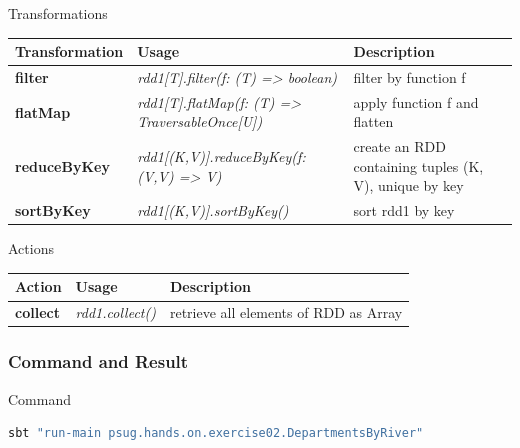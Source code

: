 \documentclass[slidetop,9pt,utf8]{beamer}
\begin{document}
\begin{CJK}{UTF8}{gbsn}
\begin{frame}
  \begin{block}{Transformations}
    \begin{center}
      \begin{tabular}{|m{2.0cm}|m{4.0cm}|m{4.9cm}|}
        \hline 
        \rowcolor{gray} \textbf{Transformation} & \textbf{Usage} & \textbf{Description} \\ \hline
        \textbf{filter} & \textit{rdd1[T]\newline.filter(f: (T) =\textgreater\xspace boolean)} & filter by function f \\ \hline
        \textbf{flatMap} & \textit{rdd1[T].flatMap(f: (T) =\textgreater\xspace TraversableOnce[U])} & apply function f and flatten \\ \hline
        \textbf{reduceByKey} & \textit{rdd1[(K,V)]\newline.reduceByKey(f:(V,V) =\textgreater\xspace V)} & create an RDD containing tuples (K, V), unique by key \\ \hline
        \textbf{sortByKey} & \textit{rdd1[(K,V)].sortByKey()} & sort rdd1 by key \\ \hline
      \end{tabular}
    \end{center}
  \end{block}

  \begin{block}{Actions}
    \begin{center}
      \begin{tabular}{|m{2.0cm}|m{4.0cm}|m{4.9cm}|}
        \hline 
        \rowcolor{gray} \textbf{Action} & \textbf{Usage} & \textbf{Description} \\ \hline
        \textbf{collect} & \textit{rdd1.collect()} & retrieve all elements of RDD as Array \\ \hline
      \end{tabular}
    \end{center}
  \end{block}

\end{frame}

\begin{frame}[fragile]
  \frametitle{Command and Result}

  \begin{block}{Command}
    \begin{lstlisting}[language=bash, style=terminal-medium]
sbt "run-main psug.hands.on.exercise02.DepartmentsByRiver"
    \end{lstlisting}
  \end{block}


\end{frame}
\end{CJK}
\end{document}
